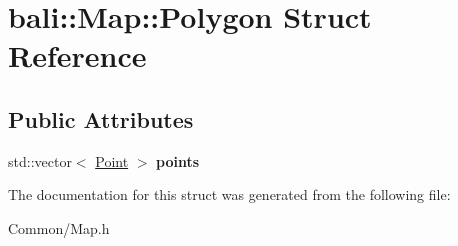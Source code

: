\hypertarget{structbali_1_1_map_1_1_polygon}{\section{bali\-:\-:Map\-:\-:Polygon Struct Reference}
\label{structbali_1_1_map_1_1_polygon}
}
\subsection*{Public Attributes}
\begin{DoxyCompactItemize}
\item 
\hypertarget{structbali_1_1_map_1_1_polygon_a4fe925272a6d7723c0e86cd19419fd60}{std\-::vector$<$ \hyperlink{structbali_1_1_map_1_1_point}{Point} $>$ {\bfseries points}}\label{structbali_1_1_map_1_1_polygon_a4fe925272a6d7723c0e86cd19419fd60}

\end{DoxyCompactItemize}


The documentation for this struct was generated from the following file\-:\begin{DoxyCompactItemize}
\item 
Common/Map.\-h\end{DoxyCompactItemize}
